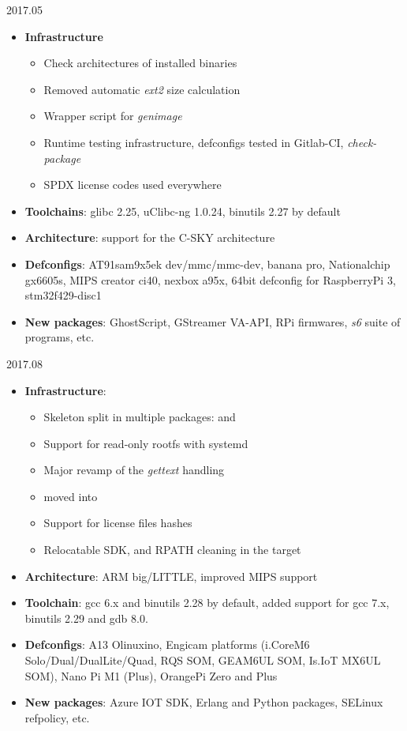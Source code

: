 \begin{frame}{2017.05}
  \begin{itemize}
  \item {\bf Infrastructure}
    \begin{itemize}
    \item Check architectures of installed binaries
    \item Removed automatic {\em ext2} size calculation
    \item Wrapper script for {\em genimage}
    \item Runtime testing infrastructure, defconfigs tested in
      Gitlab-CI, {\em check-package}
    \item SPDX license codes used everywhere
    \end{itemize}
  \item {\bf Toolchains}: glibc 2.25, uClibc-ng 1.0.24, binutils 2.27
    by default
  \item {\bf Architecture}: support for the C-SKY architecture
  \item {\bf Defconfigs}: AT91sam9x5ek dev/mmc/mmc-dev, banana pro,
    Nationalchip gx6605s, MIPS creator ci40, nexbox a95x, 64bit
    defconfig for RaspberryPi 3, stm32f429-disc1
  \item {\bf New packages}: GhostScript, GStreamer VA-API, RPi
    firmwares, {\em s6} suite of programs, etc.
  \end{itemize}
\end{frame}

\begin{frame}{2017.08}
  \begin{itemize}
  \item {\bf Infrastructure}:
    \begin{itemize}
    \item Skeleton split in multiple packages:
       and
    \item Support for read-only rootfs with systemd
    \item Major revamp of the {\em gettext} handling
    \item {} moved into 
    \item Support for license files hashes
    \item Relocatable SDK, and RPATH cleaning in the target
    \end{itemize}
  \item {\bf Architecture}: ARM big/LITTLE, improved MIPS support
  \item {\bf Toolchain}: gcc 6.x and binutils 2.28 by default, added
    support for gcc 7.x, binutils 2.29 and gdb 8.0.
  \item {\bf Defconfigs}: A13 Olinuxino, Engicam platforms (i.CoreM6
    Solo/Dual/DualLite/Quad, RQS SOM, GEAM6UL SOM, Is.IoT MX6UL
    SOM), Nano Pi M1 (Plus), OrangePi Zero and Plus
  \item {\bf New packages}: Azure IOT SDK, Erlang and Python packages,
    SELinux refpolicy, etc.
  \end{itemize}
\end{frame}
